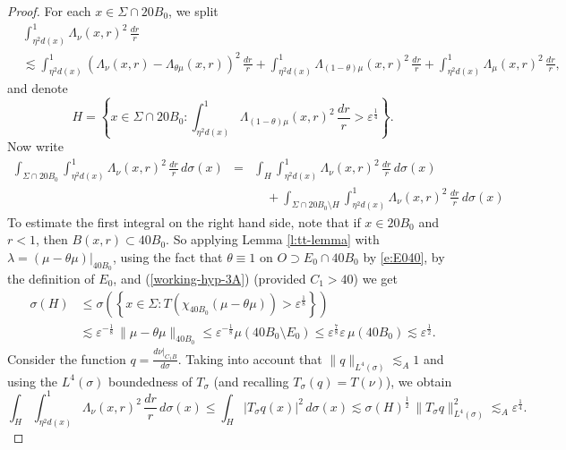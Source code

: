 \documentclass[11pt]{amsart}
\newcommand{\rf}[1]{{(\ref{#1})}}
\newcommand{\ve}{{\varepsilon}}
\theoremstyle{definition}
\theoremstyle{remark}
\numberwithin{equation}{section}
\newcommand{\ck}[1]{\left\{#1 \right\}}
\def\lec{\lesssim}
\def\lec{\lesssim}
\begin{document}
\begin{proof}
For each $x\in\Sigma \cap 20 B_{0}$, we split
\begin{align}\label{eqoq1}
 &\int_{\eta^2 d(x)}^{1}   \Lambda_{\nu}(x,r)^{2}\,\frac{dr}{r} \\
&  \lesssim \int_{\eta^2 d(x)}^{1} \!(\Lambda_{\nu}(x,r)-  \Lambda_{\theta \mu}(x,r))^{2}\,\frac{dr}{r} +\int_{\eta^2 d(x)}^{1} \!\Lambda_{(1-\theta) \mu}(x,r)^{2} \, \frac{dr}{r} 
+\int_{\eta^2 d(x)}^{1} \!\Lambda_{ \mu}(x,r)^{2}\,\frac{dr}{r},\nonumber
\end{align}
and denote\[
H=\ck{x\in \Sigma \cap 20 B_0 : \int_{\eta^2 d(x)}^{1}   \Lambda_{(1-\theta)\mu}(x,r)^{2}\,\frac{dr}{r} >\ve^{\frac14}}.
\]
Now write
\begin{eqnarray}\label{eqoq2}
\int_{\Sigma \cap 20 B_{0}}\int_{\eta^2 d(x) }^{1}  \Lambda_{\nu}(x,r)^{2}\,\frac{dr}{r}\, d\sigma(x) &=&
\int_{H}\int_{\eta^2 d(x) }^{1}  \Lambda_{\nu}(x,r)^{2}\,\frac{dr}{r}\, d\sigma(x) \nonumber\\ &&\quad +
\int_{\Sigma \cap 20 B_{0}\setminus H}\int_{\eta^2 d(x) }^{1}   \Lambda_{\nu}(x,r)^{2}\,\frac{dr}{r}\, d\sigma(x)
	\end{eqnarray}
To estimate the first integral on the right hand side, 
note that if $x\in 20 B_{0}$ and $r<1$, then $B(x,r)\subset 40B_{0}$. So
 applying Lemma \ref{l:tt-lemma} with $\lambda =(\mu- \theta \mu)|_{40B_{0}}$, using the fact that $\theta\equiv 1$ on $O\supset E_{0}\cap 40 B_{0}$ by \eqref{e:E040}, by the definition of $E_{0}$, and \rf{working-hyp-3A} (provided $C_1>40$) we get 
\begin{align*}
\sigma(H) &\leq \sigma\left(\left\{x\in\Sigma: T( \chi_{40B_0}(\mu-\theta \mu))>\ve^{\frac18}\right\}\right)\\
&
\lec \ve^{-\frac{1}{8}}\,\| \mu-\theta \mu\|_{40 B_{0}} \leq\ve^{-\frac{1}{8}} \mu(40B_{0}\setminus E_{0})\leq 
\ve^{\frac{7}{8}} \ve \,\mu(40B_{0})
\lesssim \ve^{\frac{1}{2}} . 
\end{align*}
Consider the function 
$q = \frac{d\nu|_{C_{1}B}}{d\sigma}$. Taking into account that $\|q\|_{L^4(\sigma)}\lesssim_A1$
and using the $L^4(\sigma)$ boundedness of $T_\sigma$ (and recalling $T_{\sigma}(q)=T(\nu)$), we obtain
\begin{equation}\label{eqoq*h}
\int_{H}\int_{\eta^2 d(x)}^{1} \Lambda_{\nu}(x,r)^{2} \,\frac{dr}{r}\, d\sigma (x)
\leq \int_H |T_\sigma q(x)|^2\,d\sigma(x) \lesssim \sigma(H)^{\frac12}\,\|T_\sigma q\|_{L^4(\sigma)}^2
\lesssim_A \ve^{\frac{1}{4}}.
\end{equation}


\end{proof}
\end{document}
